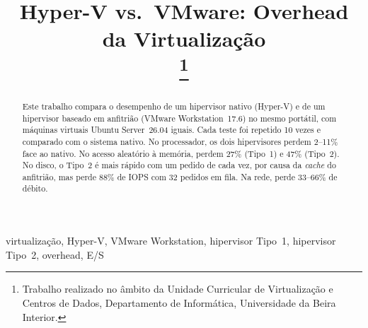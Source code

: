 \documentclass[conference]{IEEEtran}
\begin{document}
\title{Hyper-V vs.\ VMware: Overhead da Virtualização\\
\thanks{Trabalho realizado no âmbito da Unidade Curricular de Virtualização e Centros de Dados, Departamento de Informática, Universidade da Beira Interior.}
}

\author{
\and
{}
\and
{}
}

\maketitle

\begin{abstract}
Este trabalho compara o desempenho de um hipervisor nativo (Hyper-V) e de um hipervisor baseado em anfitrião (VMware Workstation~17.6) no mesmo portátil, com máquinas virtuais Ubuntu Server~26.04 iguais. Cada teste foi repetido 10 vezes e comparado com o sistema nativo. No processador, os dois hipervisores perdem 2--11\% face ao nativo. No acesso aleatório à memória, perdem 27\% (Tipo~1) e 47\% (Tipo~2). No disco, o Tipo~2 é mais rápido com um pedido de cada vez, por causa da \textit{cache} do anfitrião, mas perde 88\% de IOPS com 32 pedidos em fila. Na rede, perde 33--66\% de débito.
\end{abstract}

\begin{IEEEkeywords}
virtualização, Hyper-V, VMware Workstation, hipervisor Tipo~1, hipervisor Tipo~2, overhead, E/S
\end{IEEEkeywords}

\end{document}
